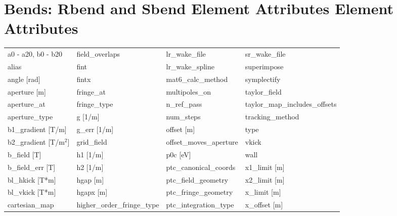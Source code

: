  \section{Bends: Rbend and Sbend Element Attributes Element Attributes}
 \label{s:list.bend}
 
 \begin{tabular}{llll} \toprule
a0 - a20, b0 - b20             & field_overlaps                 & lr_wake_file                   & sr_wake_file                   \\
alias                          & fint                           & lr_wake_spline                 & superimpose                    \\
angle [rad]                    & fintx                          & mat6_calc_method               & symplectify                    \\
aperture [m]                   & fringe_at                      & multipoles_on                  & taylor_field                   \\
aperture_at                    & fringe_type                    & n_ref_pass                     & taylor_map_includes_offsets    \\
aperture_type                  & g [1/m]                        & num_steps                      & tracking_method                \\
b1_gradient [T/m]              & g_err [1/m]                    & offset [m]                     & type                           \\
b2_gradient [T/m$^2$]          & grid_field                     & offset_moves_aperture          & vkick                          \\
b_field [T]                    & h1 [1/m]                       & p0c [eV]                       & wall                           \\
b_field_err [T]                & h2 [1/m]                       & ptc_canonical_coords           & x1_limit [m]                   \\
bl_hkick [T*m]                 & hgap [m]                       & ptc_field_geometry             & x2_limit [m]                   \\
bl_vkick [T*m]                 & hgapx [m]                      & ptc_fringe_geometry            & x_limit [m]                    \\
cartesian_map                  & higher_order_fringe_type       & ptc_integration_type           & x_offset [m]                   \\

\end{tabular}
